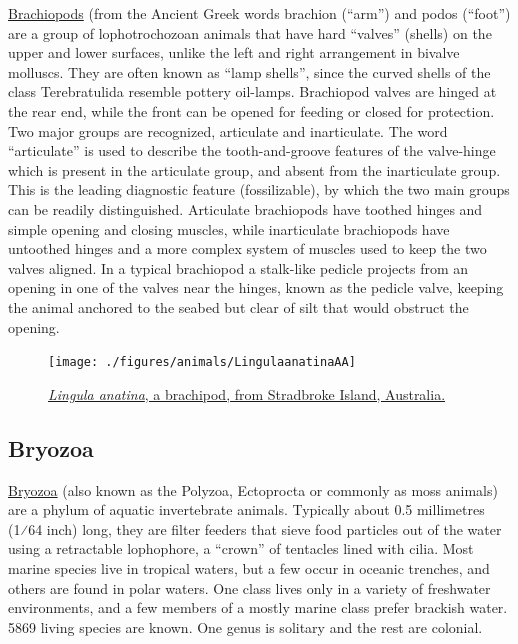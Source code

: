 \href{https://en.wikipedia.org/wiki/Brachiopod}{Brachiopods} (from the Ancient Greek words brachion (``arm'') and podos (``foot'') are a group of lophotrochozoan animals that have hard ``valves'' (shells) on the upper and lower surfaces, unlike the left and right arrangement in bivalve molluscs. They are often known as ``lamp shells'', since the curved shells of the class Terebratulida resemble pottery oil-lamps. Brachiopod valves are hinged at the rear end, while the front can be opened for feeding or closed for protection. Two major groups are recognized, articulate and inarticulate. The word ``articulate'' is used to describe the tooth-and-groove features of the valve-hinge which is present in the articulate group, and absent from the inarticulate group. This is the leading diagnostic feature (fossilizable), by which the two main groups can be readily distinguished. Articulate brachiopods have toothed hinges and simple opening and closing muscles, while inarticulate brachiopods have untoothed hinges and a more complex system of muscles used to keep the two valves aligned. In a typical brachiopod a stalk-like pedicle projects from an opening in one of the valves near the hinges, known as the pedicle valve, keeping the animal anchored to the seabed but clear of silt that would obstruct the opening.



\begin{figure}

{\centering \texttt{[image: ./figures/animals/LingulaanatinaAA]} 

}

\caption{\href{https://commons.wikimedia.org/wiki/File:LingulaanatinaAA.JPG}{\emph{Lingula anatina}, a brachipod, from Stradbroke Island, Australia.}}\label{fig:brachiopod}
\end{figure}

\hypertarget{bryozoa}{%
\subsection{Bryozoa}\label{bryozoa}}

\href{https://en.wikipedia.org/wiki/Bryozoa}{Bryozoa} (also known as the Polyzoa, Ectoprocta or commonly as moss animals) are a phylum of aquatic invertebrate animals. Typically about 0.5 millimetres (1⁄64 inch) long, they are filter feeders that sieve food particles out of the water using a retractable lophophore, a ``crown'' of tentacles lined with cilia. Most marine species live in tropical waters, but a few occur in oceanic trenches, and others are found in polar waters. One class lives only in a variety of freshwater environments, and a few members of a mostly marine class prefer brackish water. 5869 living species are known. One genus is solitary and the rest are colonial.

